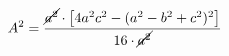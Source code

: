 \documentclass[preview]{standalone}
\begin{document}
\begin{align*}
\special{dvisvgm:raw <g id='unique000'>}A^2 = \frac{\cancel{a^2} \cdot \left[4a^2c^2-(a^2-b^2+c^2)^2\right]}{16 \cdot \cancel{a^2}}\special{dvisvgm:raw </g>}
\end{align*}
\end{document}
